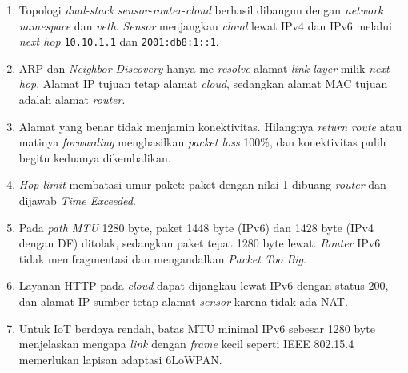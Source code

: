 \documentclass[12pt,a4paper]{report}
\newcommand{\kode}[1]{\texttt{\small #1}}
\begin{document}
\begin{enumerate}
    \item Topologi \emph{dual-stack} \emph{sensor}-\emph{router}-\emph{cloud} berhasil dibangun dengan \emph{network namespace} dan \emph{veth}. \emph{Sensor} menjangkau \emph{cloud} lewat IPv4 dan IPv6 melalui \emph{next hop} \kode{10.10.1.1} dan \kode{2001:db8:1::1}.
    \item ARP dan \emph{Neighbor Discovery} hanya me-\emph{resolve} alamat \emph{link-layer} milik \emph{next hop}. Alamat IP tujuan tetap alamat \emph{cloud}, sedangkan alamat MAC tujuan adalah alamat \emph{router}.
    \item Alamat yang benar tidak menjamin konektivitas. Hilangnya \emph{return route} atau matinya \emph{forwarding} menghasilkan \emph{packet loss} 100\%, dan konektivitas pulih begitu keduanya dikembalikan.
    \item \emph{Hop limit} membatasi umur paket: paket dengan nilai 1 dibuang \emph{router} dan dijawab \emph{Time Exceeded}.
    \item Pada \emph{path MTU} 1280 byte, paket 1448 byte (IPv6) dan 1428 byte (IPv4 dengan DF) ditolak, sedangkan paket tepat 1280 byte lewat. \emph{Router} IPv6 tidak memfragmentasi dan mengandalkan \emph{Packet Too Big}.
    \item Layanan HTTP pada \emph{cloud} dapat dijangkau lewat IPv6 dengan status 200, dan alamat IP sumber tetap alamat \emph{sensor} karena tidak ada NAT.
    \item Untuk IoT berdaya rendah, batas MTU minimal IPv6 sebesar 1280 byte menjelaskan mengapa \emph{link} dengan \emph{frame} kecil seperti IEEE 802.15.4 memerlukan lapisan adaptasi 6LoWPAN.
\end{enumerate}
\end{document}
